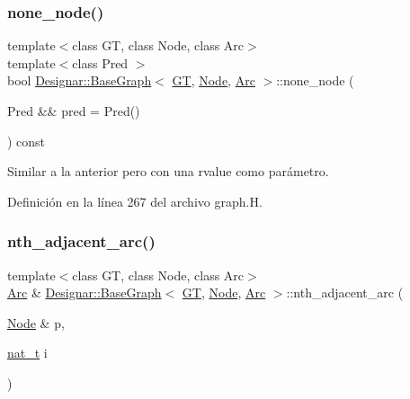 \subsubsection{\texorpdfstring{none\+\_\+node()}{none\_node()}\hspace{0.1cm}{\footnotesize\ttfamily [2/2]}}
{\footnotesize\ttfamily template$<$class GT, class Node, class Arc$>$ \\
template$<$class Pred $>$ \\
bool \hyperlink{class_designar_1_1_base_graph}{Designar\+::\+Base\+Graph}$<$ \hyperlink{demo-buildgraph_8_c_a3001c40d2c31ca87ed96cd7d1334a55e}{GT}, \hyperlink{namespace_designar_a5af326c65aa2bd26b26c410f2030d09e}{Node}, \hyperlink{namespace_designar_a3f55fb5513d62ff47cbc8f72b8e95d6f}{Arc} $>$\+::none\+\_\+node (\begin{DoxyParamCaption}\item[{Pred \&\&}]{pred = {\ttfamily Pred()} }\end{DoxyParamCaption}) const\hspace{0.3cm}{\ttfamily [inline]}}



Similar a la anterior pero con una rvalue como parámetro. 



Definición en la línea 267 del archivo graph.\+H.

\mbox{\label{class_designar_1_1_base_graph_a91c96135db95b2021510b769aedef850}} 
\subsubsection{\texorpdfstring{nth\+\_\+adjacent\+\_\+arc()}{nth\_adjacent\_arc()}\hspace{0.1cm}{\footnotesize\ttfamily [1/2]}}
{\footnotesize\ttfamily template$<$class GT, class Node, class Arc$>$ \\
\hyperlink{namespace_designar_a3f55fb5513d62ff47cbc8f72b8e95d6f}{Arc} \& \hyperlink{class_designar_1_1_base_graph}{Designar\+::\+Base\+Graph}$<$ \hyperlink{demo-buildgraph_8_c_a3001c40d2c31ca87ed96cd7d1334a55e}{GT}, \hyperlink{namespace_designar_a5af326c65aa2bd26b26c410f2030d09e}{Node}, \hyperlink{namespace_designar_a3f55fb5513d62ff47cbc8f72b8e95d6f}{Arc} $>$\+::nth\+\_\+adjacent\+\_\+arc (\begin{DoxyParamCaption}\item[{\hyperlink{namespace_designar_a5af326c65aa2bd26b26c410f2030d09e}{Node} \&}]{p,  }\item[{\hyperlink{namespace_designar_aa72662848b9f4815e7bf31a7cf3e33d1}{nat\+\_\+t}}]{i }\end{DoxyParamCaption})\hspace{0.3cm}{\ttfamily [inline]}}



